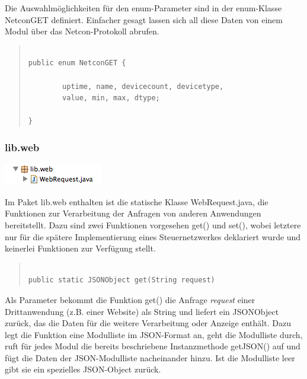\documentclass[a4paper,14pt,headsepline]{scrartcl}
\begin{document}
Die Auswahlmöglichkeiten für den enum-Parameter sind in der enum-Klasse NetconGET definiert. Einfacher gesagt lassen sich all diese Daten von einem Modul über das Netcon-Protokoll abrufen.  


\begin{quote}
\begin{verbatim}

public enum NetconGET {

	    uptime, name, devicecount, devicetype, 
	    value, min, max, dtype;

}

\end{verbatim}
\end{quote}

\newpage

\subsubsection*{lib.web}

\includegraphics[width=0.2 \paperwidth]{./bilder/lib_web.png}

Im Paket lib.web enthalten ist die statische Klasse WebRequest.java, die Funktionen zur Verarbeitung der Anfragen von anderen Anwendungen bereitstellt. Dazu sind zwei Funktionen vorgesehen get() und set(), wobei letztere nur für die spätere Implementierung eines Steuernetzwerkes deklariert wurde und keinerlei Funktionen zur Verfügung stellt. 

\begin{quote}
\begin{verbatim}

public static JSONObject get(String request)

\end{verbatim}
\end{quote} 

Als Parameter bekommt die Funktion get() die Anfrage \textit{request} einer Drittanwendung (z.B. einer Website) als String und liefert ein JSONObject zurück, das die Daten für die weitere Verarbeitung oder Anzeige enthält. Dazu legt die Funktion eine Modulliste im JSON-Format an, geht die Modulliste durch, ruft für jedes Modul die bereits beschriebene Instanzmethode getJSON() auf und fügt die Daten der JSON-Modulliste nacheinander hinzu. Ist die Modulliste leer gibt sie ein spezielles JSON-Object zurück. 
\end{document}
